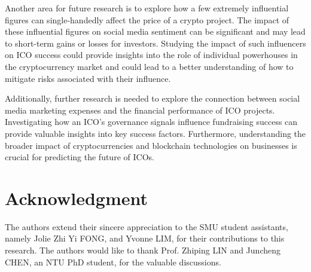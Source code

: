 \documentclass[runningheads]{llncs}
\begin{document}
Another area for future research is to explore how a few extremely influential figures can single-handedly affect the price of a crypto project. The impact of these influential figures on social media sentiment can be significant and may lead to short-term gains or losses for investors. Studying the impact of such influencers on ICO success could provide insights into the role of individual powerhouses in the cryptocurrency market and could lead to a better understanding of how to mitigate risks associated with their influence. 

Additionally, further research is needed to explore the connection between social media marketing expenses and the financial performance of ICO projects. Investigating how an ICO's governance signals influence fundraising success can provide valuable insights into key success factors. Furthermore, understanding the broader impact of cryptocurrencies and blockchain technologies on businesses is crucial for predicting the future of ICOs.

\section*{Acknowledgment}
The authors extend their sincere appreciation to the SMU student assistants, namely Jolie Zhi Yi FONG, and Yvonne LIM, for their contributions to this research. The authors would like to thank Prof. Zhiping LIN and Juncheng CHEN, an NTU PhD student, for the valuable discussions. 




\appendix
\end{document}
